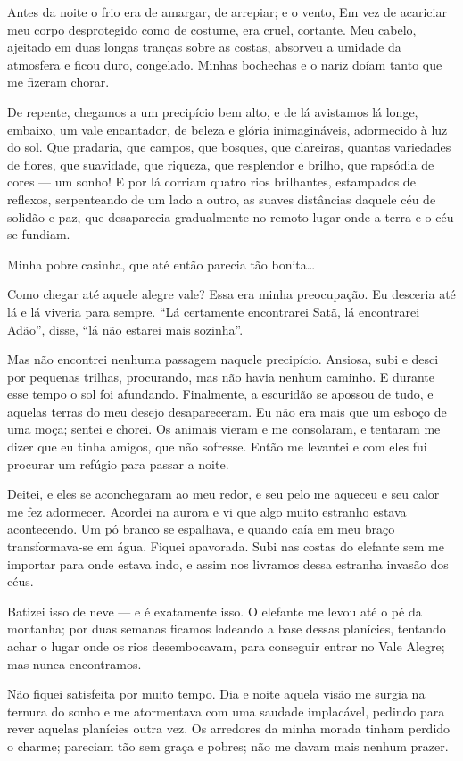 Antes da noite o frio era de amargar, de arrepiar; e o vento,
Em vez de acariciar meu corpo
desprotegido como de costume, era cruel, cortante. Meu cabelo, ajeitado em
duas longas tranças sobre as costas, absorveu a umidade da atmosfera e ficou
duro, congelado. Minhas bochechas e o nariz doíam tanto que me fizeram chorar.

De repente, chegamos a um precipício bem alto, e de lá avistamos
lá longe, embaixo, um vale encantador, de beleza e glória inimagináveis,
adormecido à luz do sol. Que pradaria, que campos, que bosques, que clareiras, quantas
variedades de flores, que suavidade, que riqueza, que resplendor e brilho, que
rapsódia de cores --- um sonho! E por lá corriam quatro rios brilhantes,
estampados de reflexos, serpenteando de um lado a outro, as suaves distâncias
daquele céu de solidão e paz, que desaparecia gradualmente no remoto lugar
onde a terra e o céu se fundiam.

Minha pobre casinha, que até então parecia tão bonita\ldots{}

Como chegar até aquele alegre vale? Essa era minha preocupação. Eu desceria até lá
e lá viveria para sempre. “Lá certamente encontrarei Satã, lá encontrarei Adão”,
disse, “lá não estarei mais sozinha”.

Mas não encontrei nenhuma passagem naquele precipício. Ansiosa, subi e desci
por pequenas trilhas, procurando, mas não havia nenhum caminho. E durante
esse tempo o sol foi afundando. Finalmente, a escuridão se apossou de tudo, e
aquelas terras do meu desejo desapareceram. Eu não era mais que um esboço de uma
moça; sentei e chorei. Os animais vieram e me consolaram, e tentaram me
dizer que eu tinha amigos, que não sofresse. Então me levantei e com eles fui
procurar um refúgio para passar a noite.

Deitei, e eles se aconchegaram ao meu redor, e seu pelo me aqueceu e seu calor me fez adormecer.
Acordei na aurora e vi que
algo muito estranho estava acontecendo. Um pó branco se espalhava, e
quando caía em meu braço transformava-se em água. Fiquei apavorada. Subi
nas costas do elefante sem me importar para onde estava indo, e assim nos
livramos dessa estranha invasão dos céus.

Batizei isso de neve --- e é exatamente isso. O elefante me levou até o pé da
montanha; por duas semanas ficamos ladeando a base dessas planícies, tentando
achar o lugar onde os rios desembocavam, para conseguir entrar no Vale Alegre;
mas nunca encontramos.

Não fiquei satisfeita por muito tempo. Dia e noite aquela visão me surgia na
ternura do sonho e me atormentava com uma saudade implacável, pedindo para rever
aquelas planícies outra vez. Os arredores da minha morada tinham perdido o
charme; pareciam tão sem graça e pobres; não me davam mais nenhum prazer.

